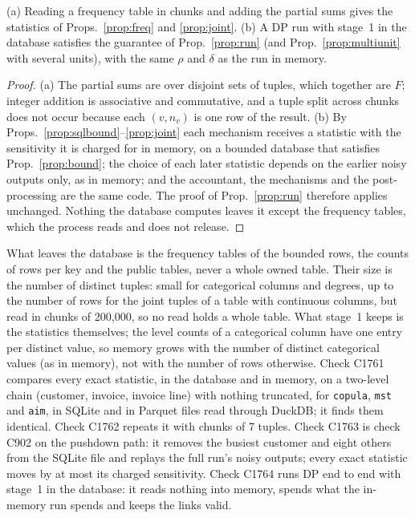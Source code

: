 \setcounter{proposition}{1762}
\begin{proposition}\label{prop:chunks}
(a) Reading a frequency table in chunks and adding the partial sums gives the statistics of Props.~\ref{prop:freq} and \ref{prop:joint}. (b) A DP run with stage~1 in the database satisfies the guarantee of Prop.~\ref{prop:run} (and Prop.~\ref{prop:multiunit} with several units), with the same $\rho$ and $\delta$ as the run in memory.
\end{proposition}
\begin{proof}
(a) The partial sums are over disjoint sets of tuples, which together are $F$; integer addition is associative and commutative, and a tuple split across chunks does not occur because each $(v,n_v)$ is one row of the result. (b) By Props.~\ref{prop:sqlbound}--\ref{prop:joint} each mechanism receives a statistic with the sensitivity it is charged for in memory, on a bounded database that satisfies Prop.~\ref{prop:bound}; the choice of each later statistic depends on the earlier noisy outputs only, as in memory; and the accountant, the mechanisms and the post-processing are the same code. The proof of Prop.~\ref{prop:run} therefore applies unchanged. Nothing the database computes leaves it except the frequency tables, which the process reads and does not release.
\end{proof}
\noindent What leaves the database is the frequency tables of the bounded rows, the counts of rows per key and the public tables, never a whole owned table. Their size is the number of distinct tuples: small for categorical columns and degrees, up to the number of rows for the joint tuples of a table with continuous columns, but read in chunks of 200,000, so no read holds a whole table. What stage~1 keeps is the statistics themselves; the level counts of a categorical column have one entry per distinct value, so memory grows with the number of distinct categorical values (as in memory), not with the number of rows otherwise. Check C1761 compares every exact statistic, in the database and in memory, on a two-level chain (customer, invoice, invoice line) with nothing truncated, for \texttt{copula}, \texttt{mst} and \texttt{aim}, in SQLite and in Parquet files read through DuckDB; it finds them identical. Check C1762 repeats it with chunks of 7 tuples. Check C1763 is check C902 on the pushdown path: it removes the busiest customer and eight others from the SQLite file and replays the full run's noisy outputs; every exact statistic moves by at most its charged sensitivity. Check C1764 runs DP end to end with stage~1 in the database: it reads nothing into memory, spends what the in-memory run spends and keeps the links valid.

\setcounter{proposition}{\value{savedproppush}}
